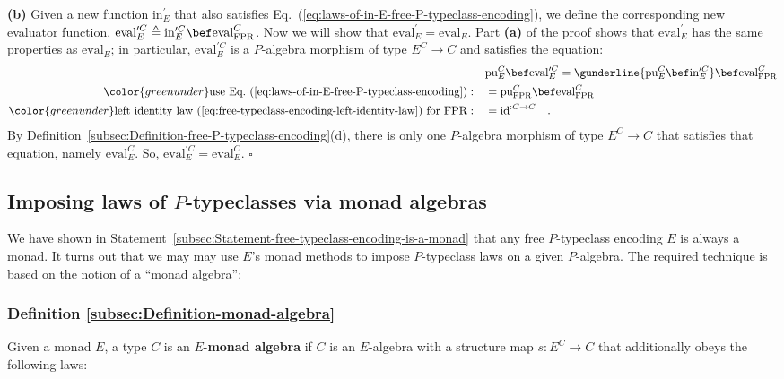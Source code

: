 \textbf{(b)} Given a new function $\text{in}_{E}^{\prime}$ that also
satisfies Eq.~(\ref{eq:laws-of-in-E-free-P-typeclass-encoding}),
we define the corresponding new evaluator function, $\text{eval}_{E}^{\prime C}\triangleq\text{in}_{E}^{\prime C}\bef\text{eval}_{\text{FPR}}^{C}$.
Now we will show that $\text{eval}_{E}^{\prime}=\text{eval}_{E}$.
Part \textbf{(a)} of the proof shows that $\text{eval}_{E}^{\prime}$
has the same properties as $\text{eval}_{E}$; in particular, $\text{eval}_{E}^{\prime C}$
is a $P$-algebra morphism of type $E^{C}\rightarrow C$ and satisfies
the equation:
\begin{align*}
 & \text{pu}_{E}^{C}\bef\text{eval}_{E}^{\prime C}=\gunderline{\text{pu}_{E}^{C}\bef\text{in}_{E}^{\prime C}}\bef\text{eval}_{\text{FPR}}^{C}\\
{\color{greenunder}\text{use Eq.~(\ref{eq:laws-of-in-E-free-P-typeclass-encoding})}:}\quad & =\text{pu}_{\text{FPR}}^{C}\bef\text{eval}_{\text{FPR}}^{C}\\
{\color{greenunder}\text{left identity law~(\ref{eq:free-typeclass-encoding-left-identity-law}) for }\text{FPR}:}\quad & =\text{id}^{:C\rightarrow C}\quad.
\end{align*}
By Definition~\ref{subsec:Definition-free-P-typeclass-encoding}(d),
there is only one $P$-algebra morphism of type $E^{C}\rightarrow C$
that satisfies that equation, namely $\text{eval}_{E}^{C}$. So, $\text{eval}_{E}^{\prime C}=\text{eval}_{E}^{C}$.
$\square$

\subsection{Imposing laws of $P$-typeclasses via monad algebras}

We have shown in Statement~\ref{subsec:Statement-free-typeclass-encoding-is-a-monad}
that any free $P$-typeclass encoding $E$ is always a monad. It turns
out that we may may use $E$\textsf{'}s monad methods to impose $P$-typeclass
laws on a given $P$-algebra. The required technique is based on the
notion of a \textsf{``}monad algebra\textsf{''}:

\subsubsection{Definition \label{subsec:Definition-monad-algebra}\ref{subsec:Definition-monad-algebra}}

Given a monad $E$, a type $C$ is an $E$-\textbf{monad algebra}
if $C$ is an $E$-algebra with a structure map $s:E^{C}\rightarrow C$
that additionally obeys the following laws:

